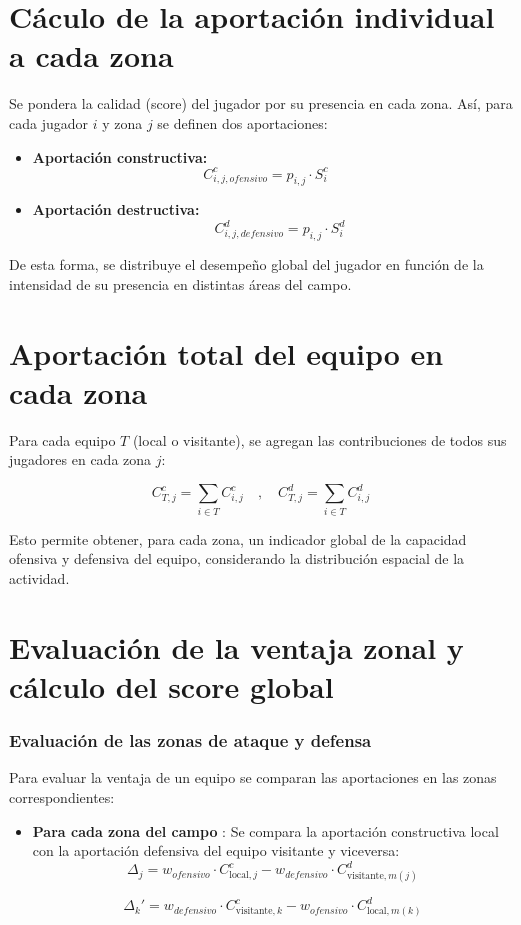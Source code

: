 \section{Cáculo de la aportación individual a cada zona}
Se pondera la calidad (score) del jugador por su presencia en cada zona. Así, para
cada jugador $i$ y zona $j$ se definen dos aportaciones:

\begin{itemize}
    \item \textbf{Aportación constructiva:} 
    \[ C^c_{i,j,ofensivo} = p_{i,j} \cdot S_i^c \quad \]
    \item \textbf{Aportación destructiva:}
    \[ \quad C^d_{i,j, defensivo} = p_{i,j} \cdot S_i^d \]
\end{itemize}

De esta forma, se distribuye el desempeño global del jugador en función de la intensidad
de su presencia en distintas áreas del campo.

\section{Aportación total del equipo en cada zona}
Para cada equipo $T$ (local o visitante), se agregan las contribuciones de todos sus
jugadores en cada zona $j$:

\[ C^c_{T,j} = \sum_{i \in T} C^c_{i,j} \quad , \quad C^d_{T,j} = \sum_{i \in T} C^d_{i,j} \]

Esto permite obtener, para cada zona, un indicador global de la capacidad ofensiva y
defensiva del equipo, considerando la distribución espacial de la actividad.

\section{Evaluación de la ventaja zonal y cálculo del score global}
\subsubsection*{Evaluación de las zonas de ataque y defensa}

Para evaluar la ventaja de un equipo se comparan las aportaciones en las zonas correspondientes:

\begin{itemize}
    \item \textbf{Para cada zona del campo} : Se compara la aportación constructiva local con la aportación defensiva del equipo visitante y viceversa:
    \[ \Delta_j = w_{ofensivo} \cdot C^c_{\text{local},j} - w_{defensivo} \cdot C^d_{\text{visitante},m(j)} \]
    
    \[ \Delta_k' = w_{defensivo} \cdot C^c_{\text{visitante},k} - w_{ofensivo} \cdot C^d_{\text{local},m(k)} \]
    
\end{itemize}


